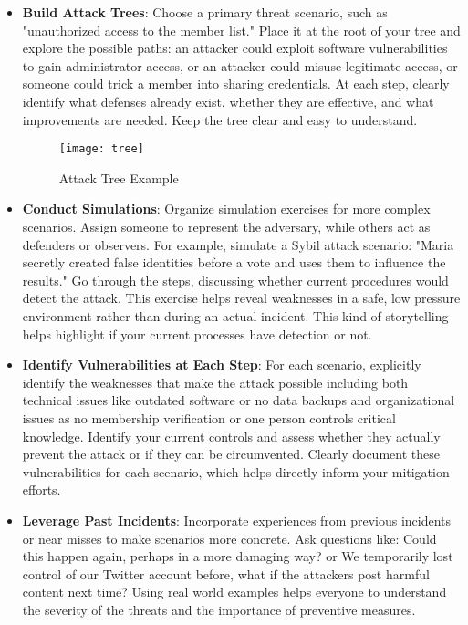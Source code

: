 \begin{itemize}

    \item \textbf{Build Attack Trees}: Choose a primary threat scenario, such as
    "unauthorized access to the member list." Place it at the root of your tree and
    explore the possible paths: an attacker could exploit software vulnerabilities
    to gain administrator access, or an attacker could misuse legitimate access, or
    someone could trick a member into sharing credentials. At each step, clearly
    identify what defenses already exist, whether they are effective, and what
    improvements are needed. Keep the tree clear and easy to understand.

    \begin{figure}[htbp]
        \centering
        \texttt{[image: tree]}
        \caption{Attack Tree Example}
        \label{fig:attack_tree_example}
    \end{figure}

    \item \textbf{Conduct Simulations}: Organize simulation exercises for
    more complex scenarios. Assign someone to represent the adversary, while others
    act as defenders or observers. For example, simulate a Sybil attack scenario:
    "Maria secretly created false identities before a vote and uses them to
    influence the results." Go through the steps, discussing whether current
    procedures would detect the attack. This exercise helps reveal weaknesses in a
    safe, low pressure environment rather than during an actual incident.
    This kind of storytelling helps highlight if your current processes have detection or not.

    \item \textbf{Identify Vulnerabilities at Each Step}: For each scenario,
    explicitly identify the weaknesses that make the attack possible including both
    technical issues like outdated software or no data backups and organizational
    issues as no membership verification or one person controls critical knowledge.
    Identify your current controls and assess whether they actually prevent the
    attack or if they can be circumvented. Clearly document these
    vulnerabilities for each scenario, which helps directly inform your mitigation
    efforts.

    \item \textbf{Leverage Past Incidents}: Incorporate experiences from previous
    incidents or near misses to make scenarios more concrete. Ask questions like: Could this
    happen again, perhaps in a more damaging way? or We temporarily lost
    control of our Twitter account before, what if the attackers post harmful content
    next time? Using real world examples helps everyone to understand the severity of
    the threats and the importance of preventive measures.

\end{itemize}

